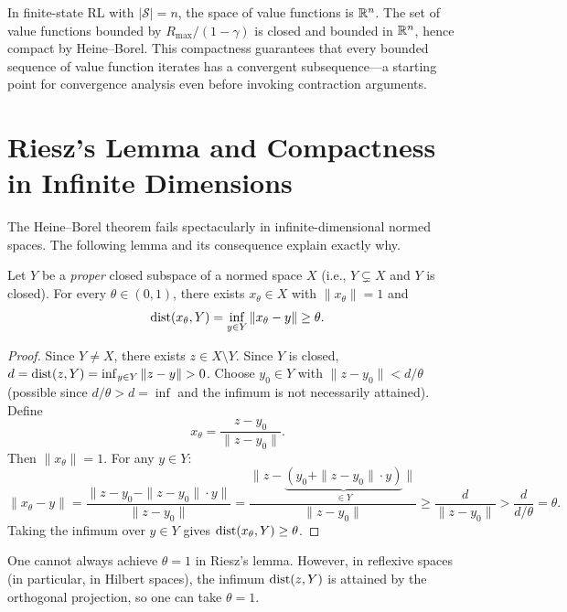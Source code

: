 \documentclass[11pt,a4paper]{article}
\begin{document}
\begin{rlconnection}[title={Heine--Borel and Finite-State RL}]
In finite-state RL with $|\mathcal{S}| = n$, the space of value functions is
$\mathbb{R}^n$. The set of value functions bounded by $R_{\max}/(1-\gamma)$ is
closed and bounded in $\mathbb{R}^n$, hence compact by Heine--Borel. This
compactness guarantees that every bounded sequence of value function iterates
has a convergent subsequence---a starting point for convergence analysis
even before invoking contraction arguments.
\end{rlconnection}


\section{Riesz's Lemma and Compactness in Infinite Dimensions}
\label{sec:riesz}

The Heine--Borel theorem fails spectacularly in infinite-dimensional normed
spaces. The following lemma and its consequence explain exactly why.

\begin{lemma}
\label{lem:riesz}
Let $Y$ be a \emph{proper} closed subspace of a normed space $X$ (i.e.,
$Y \subsetneq X$ and $Y$ is closed). For every $\theta \in (0,1)$, there
exists $x_\theta \in X$ with $\|x_\theta\| = 1$ and
\[
\operatorname{dist}(x_\theta, Y) = \inf_{y \in Y} \|x_\theta - y\| \ge \theta.
\]
\end{lemma}

\begin{proof}
Since $Y \ne X$, there exists $z \in X \setminus Y$. Since $Y$ is closed,
$d = \operatorname{dist}(z, Y) = \inf_{y \in Y} \|z - y\| > 0$. Choose $y_0 \in Y$ with
$\|z - y_0\| < d / \theta$ (possible since $d / \theta > d = \inf$ and the
infimum is not necessarily attained). Define
\[
x_\theta = \frac{z - y_0}{\|z - y_0\|}.
\]
Then $\|x_\theta\| = 1$. For any $y \in Y$:
\[
\|x_\theta - y\|
= \frac{\|z - y_0 - \|z - y_0\| \cdot y\|}{\|z - y_0\|}
= \frac{\|z - \underbrace{(y_0 + \|z - y_0\| \cdot y)}_{\in Y}\|}
       {\|z - y_0\|}
\ge \frac{d}{\|z - y_0\|}
> \frac{d}{d/\theta} = \theta.
\]
Taking the infimum over $y \in Y$ gives $\operatorname{dist}(x_\theta, Y) \ge \theta$.
\end{proof}

\begin{remark}
\label{rem:riesz_sharp}
One cannot always achieve $\theta = 1$ in Riesz's lemma. However, in
reflexive spaces (in particular, in Hilbert spaces), the infimum
$\operatorname{dist}(z, Y)$ is attained by the orthogonal projection, so one can take
$\theta = 1$.
\end{remark}
\end{document}
